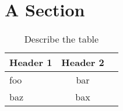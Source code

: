 \section{A Section}


\begin{table}[h]
  \label{tab:table_name}
  \caption{Describe the table}
  \centering
    \begin{tabular}{l c c}
      \toprule
      Header 1 & Header 2 \\
      \midrule
      foo & bar \\
      baz & bax \\
      \bottomrule
    \end{tabular}
\end{table}
